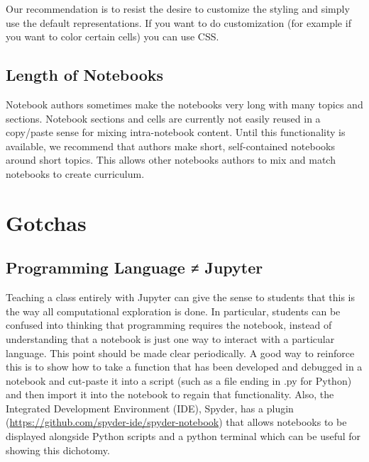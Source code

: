 \documentclass[]{book}
\begin{document}
Our recommendation is to resist the desire to customize the styling and
simply use the default representations. If you want to do customization
(for example if you want to color certain cells) you can use CSS.

\subsection{Length of Notebooks}\label{length-of-notebooks}

Notebook authors sometimes make the notebooks very long with many topics
and sections. Notebook sections and cells are currently not easily
reused in a copy/paste sense for mixing intra-notebook content. Until
this functionality is available, we recommend that authors make short,
self-contained notebooks around short topics. This allows other
notebooks authors to mix and match notebooks to create curriculum.

\section{Gotchas}\label{gotchas}

\subsection{Programming Language ≠
Jupyter}\label{programming-language-jupyter}

Teaching a class entirely with Jupyter can give the sense to students
that this is the way all computational exploration is done. In
particular, students can be confused into thinking that programming
requires the notebook, instead of understanding that a notebook is just
one way to interact with a particular language. This point should be
made clear periodically. A good way to reinforce this is to show how to
take a function that has been developed and debugged in a notebook and
cut-paste it into a script (such as a file ending in .py for Python) and
then import it into the notebook to regain that functionality. Also, the
Integrated Development Environment (IDE), Spyder, has a plugin
(\url{https://github.com/spyder-ide/spyder-notebook}) that allows
notebooks to be displayed alongside Python scripts and a python terminal
which can be useful for showing this dichotomy.
\end{document}
